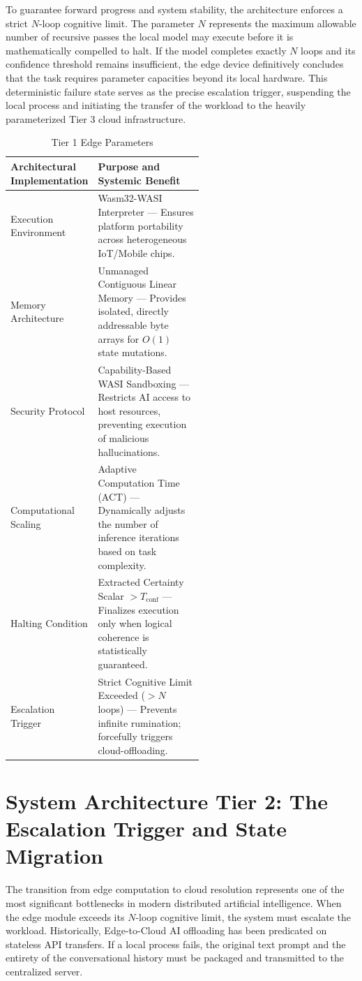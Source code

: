 \documentclass[11pt,a4paper]{article}
\begin{document}
To guarantee forward progress and system stability, the architecture enforces a strict $N$-loop cognitive limit. The parameter $N$ represents the maximum allowable number of recursive passes the local model may execute before it is mathematically compelled to halt. If the model completes exactly $N$ loops and its confidence threshold remains insufficient, the edge device definitively concludes that the task requires parameter capacities beyond its local hardware. This deterministic failure state serves as the precise escalation trigger, suspending the local process and initiating the transfer of the workload to the heavily parameterized Tier 3 cloud infrastructure.

\begin{table}[htbp]
\centering
\caption{Tier 1 Edge Parameters}
\begin{tabular}{lp{0.55\linewidth}}
\toprule
\textbf{Architectural Implementation} & \textbf{Purpose and Systemic Benefit} \\
\midrule
Execution Environment & Wasm32-WASI Interpreter --- Ensures platform portability across heterogeneous IoT/Mobile chips. \\
Memory Architecture & Unmanaged Contiguous Linear Memory --- Provides isolated, directly addressable byte arrays for $O(1)$ state mutations. \\
Security Protocol & Capability-Based WASI Sandboxing --- Restricts AI access to host resources, preventing execution of malicious hallucinations. \\
Computational Scaling & Adaptive Computation Time (ACT) --- Dynamically adjusts the number of inference iterations based on task complexity. \\
Halting Condition & Extracted Certainty Scalar $> T_{\mathrm{conf}}$ --- Finalizes execution only when logical coherence is statistically guaranteed. \\
Escalation Trigger & Strict Cognitive Limit Exceeded ($>N$ loops) --- Prevents infinite rumination; forcefully triggers cloud-offloading. \\
\bottomrule
\end{tabular}
\end{table}

\section{System Architecture Tier 2: The Escalation Trigger and State Migration}

The transition from edge computation to cloud resolution represents one of the most significant bottlenecks in modern distributed artificial intelligence. When the edge module exceeds its $N$-loop cognitive limit, the system must escalate the workload. Historically, Edge-to-Cloud AI offloading has been predicated on stateless API transfers. If a local process fails, the original text prompt and the entirety of the conversational history must be packaged and transmitted to the centralized server.
\end{document}
